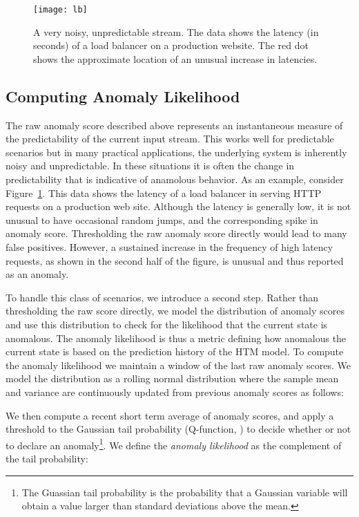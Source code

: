 \documentclass{article}
\begin{document}
\begin{figure}[ht]
\vskip 0.2in
\begin{center}
\centerline{\texttt{[image: lb]}}
\caption{A very noisy, unpredictable stream. The data shows the
latency (in seconds) of a load balancer on a production website. The red dot shows the
approximate location of an unusual increase in latencies.}
\label{lb}
\end{center}
\vskip -0.2in
\end{figure}

\subsection{Computing Anomaly Likelihood}

The raw anomaly score described above represents an instantaneous measure of the
predictability of the current input stream. This works well for
predictable scenarios but in many practical applications, the underlying system
is inherently noisy and unpredictable. In these situations it is often the
change in predictability that is indicative of anamolous behavior. As an
example, consider Figure~\ref{lb}. This data shows the latency of a load balancer in
serving HTTP requests on a production web site.  Although the latency is
generally low, it is not unusual to have occasional random jumps, and the
corresponding spike in anomaly score. Thresholding the raw anomaly score directly
would lead to many false positives. However, a sustained increase in the
frequency of high latency requests, as shown in the second half of the figure,
is unusual and thus reported as an anomaly.

To handle this class of scenarios, we introduce a second step. Rather than
thresholding the raw score directly, we model the distribution of anomaly scores
and use this distribution to check for the likelihood that the current state is
anomalous. The anomaly likelihood is thus a metric defining how anomalous the
current state is based on the prediction history of the HTM model. To compute
the anomaly likelihood we maintain a window of the last  raw anomaly scores.
We model the distribution as a rolling normal distribution where the sample mean
and variance are continuously updated from previous anomaly scores as follows:





We then compute a recent short term average of anomaly scores, and apply a
threshold to the Gaussian tail probability (Q-function, \cite{Karagiannidis2007}) to decide
whether or not to declare an anomaly\footnote{The Guassian tail probability is
the probability that a Gaussian variable will obtain a value larger than 
standard deviations above the mean.}. We define the {\em anomaly likelihood} as
the complement of the tail probability:
\end{document}
